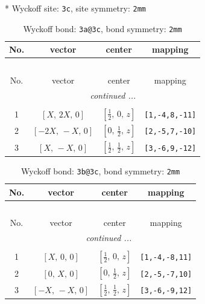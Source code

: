 \documentclass[fleqn,8pt]{jsarticle}
\begin{document}
* Wyckoff site: {\tt 3c}, site symmetry: {\tt 2mm}
\renewcommand{\arraystretch}{1.2}
\begin{longtable}{cccc}
\caption{Wyckoff bond: {\tt 3a@3c}, bond symmetry: {\tt 2mm}}
 \\
 \hline \hline
No. & vector & center & mapping \\ \hline \endfirsthead

\multicolumn{3}{l}{\tablename\ \thetable{}} \\
 \hline \hline
No. & vector & center & mapping \\ \hline \endhead

 \hline \hline
\multicolumn{3}{r}{\footnotesize\it continued ...} \\ \endfoot

 \hline \hline
\multicolumn{3}{r}{} \\ \endlastfoot

1 & $\left[ X,\, 2 X,\, 0 \right]$ & $\left[ \frac{1}{2},\, 0,\, z \right]$ & {\tt [1,-4,8,-11]} \\ \hline
2 & $\left[ - 2 X,\, - X,\, 0 \right]$ & $\left[ 0,\, \frac{1}{2},\, z \right]$ & {\tt [2,-5,7,-10]} \\ \hline
3 & $\left[ X,\, - X,\, 0 \right]$ & $\left[ \frac{1}{2},\, \frac{1}{2},\, z \right]$ & {\tt [3,-6,9,-12]} \\
\end{longtable}
\renewcommand{\arraystretch}{1.2}
\begin{longtable}{cccc}
\caption{Wyckoff bond: {\tt 3b@3c}, bond symmetry: {\tt 2mm}}
 \\
 \hline \hline
No. & vector & center & mapping \\ \hline \endfirsthead

\multicolumn{3}{l}{\tablename\ \thetable{}} \\
 \hline \hline
No. & vector & center & mapping \\ \hline \endhead

 \hline \hline
\multicolumn{3}{r}{\footnotesize\it continued ...} \\ \endfoot

 \hline \hline
\multicolumn{3}{r}{} \\ \endlastfoot

1 & $\left[ X,\, 0,\, 0 \right]$ & $\left[ \frac{1}{2},\, 0,\, z \right]$ & {\tt [1,-4,-8,11]} \\ \hline
2 & $\left[ 0,\, X,\, 0 \right]$ & $\left[ 0,\, \frac{1}{2},\, z \right]$ & {\tt [2,-5,-7,10]} \\ \hline
3 & $\left[ - X,\, - X,\, 0 \right]$ & $\left[ \frac{1}{2},\, \frac{1}{2},\, z \right]$ & {\tt [3,-6,-9,12]} \\
\end{longtable}
\end{document}
